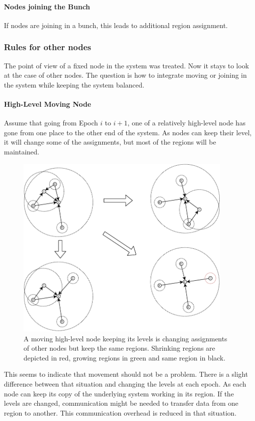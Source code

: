\documentclass[a4paper,11pt,oneside]{report}
\begin{document}
\paragraph{Nodes joining the Bunch} 
If nodes are joining in a bunch, this leads to additional region assignment. 

\subsubsection{Rules for other nodes}
The point of view of a fixed node in the system was treated. Now it stays to look at the case of other nodes. The
question is how to integrate moving or joining in the system while keeping the system
balanced. 

\paragraph{High-Level Moving Node}
Assume that going from Epoch $i$ to $i+1$, one of a relatively high-level node
has gone from one place to the other end of the system. As nodes can keep their
level, it will change some of the assignments, but most of the regions will be
maintained. 

\begin{figure}[!h] 
\centering
\includegraphics[width=300pt]{figures/LocarnoTreaties-Moving}
\caption{A moving high-level node keeping its levels is changing assignments of other
  nodes but keep the same regions. Shrinking regions are depicted in red,
  growing regions in green and same region in black. }
\label{fig:LocarnoTreaties-Moving}
\end{figure}

This seems to indicate that movement should not be a problem. There is a
slight difference between that situation and changing the levels at each
epoch. As each node can keep its copy of the underlying system working in its
region. If the levels are changed, communication might be needed to transfer
data from one region to another. This communication overhead is reduced in
that situation. 
\end{document}
